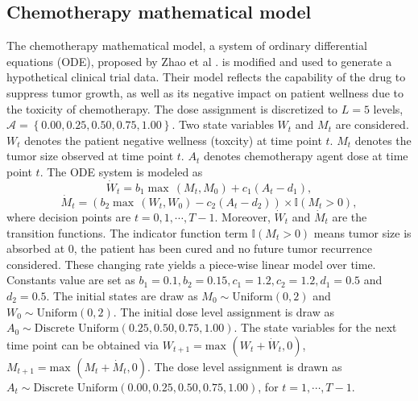 \documentclass{article}
\newcommand{\mb}{\mathbb}
\newcommand{\ml}{\mathcal}
\newcommand{\lt}{\left}
\newcommand{\rt}{\right}
\begin{document}
\subsection{Chemotherapy mathematical model}
The chemotherapy mathematical model, a system of ordinary differential equations (ODE), proposed by Zhao et al \cite{odemodel}. is modified and used to generate a hypothetical clinical trial data. Their model reflects the capability of the drug to suppress tumor growth, as well as its negative impact on patient wellness due to the toxicity of chemotherapy. The dose assignment is discretized to $L=5$ levels, $\ml{A} = \left\{0.00, 0.25, 0.50, 0.75, 1.00 \right\}$.  Two state variables $W_t$ and $M_t$ are considered. $W_t$ denotes the patient negative wellness (toxcity) at time point $t$. $M_t$ denotes the tumor size observed at time point $t$. $A_t$ denotes chemotherapy agent dose at time point $t$. The ODE system is modeled as~\cite{odemodel}
$$\dot{W}_t = b_1 \max \,(M_t, M_0) + c_1 (A_t - d_1),$$
$$\dot{M}_t = \lt(b_2 \max \,(W_t, W_0) - c_2 (A_t - d_2)\rt) \times \mb{I} (M_t >0),$$
where decision points are $t= 0, 1,\cdots, T-1$. Moreover, $\dot{W}_t$ and $\dot{M}_t$ are the transition functions.  The indicator function term $\mb{I}(M_t > 0)$ means tumor size is absorbed at 0, the patient has been cured and no future tumor recurrence considered. These changing rate yields a piece-wise linear model over time.  Constants value are set as 
$b_1 = 0.1, b_2 = 0.15, c_1 = 1.2, c_2 = 1.2, d_1 = 0.5$ and $d_2 = 0.5$.  The initial states are draw as $M_0 \sim \text{Uniform}(0, 2)$ and $W_0 \sim \text{Uniform}(0, 2)$. The initial dose level assignment is draw as $A_0 \sim \text{Discrete Uniform} ( 0.25, 0.50, 0.75, 1.00 )$. The state variables for the next time point can be obtained via $W_{t+1} = \text{max } (W_t + \dot{W}_t, 0)$, $M_{t+1} = \text{max } (M_t + \dot{M}_t, 0)$.  The dose level assignment is drawn as
$A_t  \sim \text{Discrete Uniform} ( 0.00, 0.25, 0.50, 0.75, 1.00 )$, for $t = 1, \cdots, T-1$.\\
\end{document}
